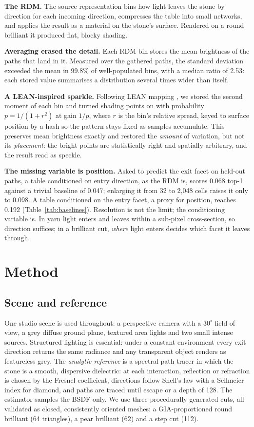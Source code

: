 \documentclass[conference]{IEEEtran}
\newcommand{\dg}{^{\circ}}
\begin{document}
\textbf{The RDM.} The source representation bins how light leaves the stone by
direction for each incoming direction, compresses the table into small networks,
and applies the result as a material on the stone's surface. Rendered on a round
brilliant it produced flat, blocky shading.

\textbf{Averaging erased the detail.} Each RDM bin stores the mean brightness of
the paths that land in it. Measured over the gathered paths, the standard
deviation exceeded the mean in 99.8\% of well-populated bins, with a median ratio
of 2.53: each stored value summarises a distribution several times wider than
itself.

\textbf{A LEAN-inspired sparkle.} Following LEAN mapping \cite{olano2010}, we
stored the second moment of each bin and turned shading points on with
probability $p=1/(1+r^2)$ at gain $1/p$, where $r$ is the bin's relative spread,
keyed to surface position by a hash so the pattern stays fixed as samples
accumulate. This preserves mean brightness exactly and restored the
\emph{amount} of variation, but not its \emph{placement}: the bright points are
statistically right and spatially arbitrary, and the result read as speckle.

\textbf{The missing variable is position.} Asked to predict the exit facet on
held-out paths, a table conditioned on entry direction, as the RDM is, scores
0.068 top-1 against a trivial baseline of 0.047; enlarging it from 32 to 2,048
cells raises it only to 0.098. A table conditioned on the entry facet, a proxy
for position, reaches 0.192 (Table~\ref{tab:baselines}). Resolution is not the
limit; the conditioning variable is. In yarn light enters and leaves within a
sub-pixel cross-section, so direction suffices; in a brilliant cut, \emph{where}
light enters decides which facet it leaves through.

\section{Method}
\label{sec:method}

\subsection{Scene and reference}

One studio scene is used throughout: a perspective camera with a $30\dg$ field
of view, a grey diffuse ground plane, textured area lights and two small intense
sources. Structured lighting is essential: under a constant environment every
exit direction returns the same radiance and any transparent object renders as
featureless grey. The \emph{analytic reference} is a spectral path tracer in
which the stone is a smooth, dispersive dielectric: at each interaction,
reflection or refraction is chosen by the Fresnel coefficient, directions follow
Snell's law with a Sellmeier index for diamond, and paths are traced until
escape or a depth of 128. The estimator samples the BSDF only. We use three
procedurally generated cuts, all validated as closed, consistently oriented
meshes: a GIA-proportioned round brilliant (64 triangles), a pear brilliant (62)
and a step cut (112).
\end{document}

